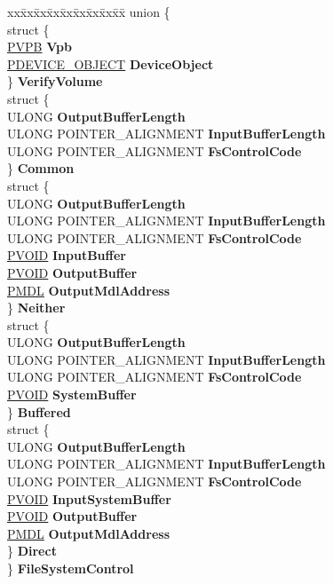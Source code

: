 \begin{DoxyCompactItemize}
\begin{tabbing}
\end{tabbing}\item 
\mbox{\label{union___f_l_t___p_a_r_a_m_e_t_e_r_s_a6e54639bd86b1bb9b2277ef36c242e44}} 
\begin{tabbing}
xx\=xx\=xx\=xx\=xx\=xx\=xx\=xx\=xx\=\kill
union \{\\
\>struct \{\\
\>\>\hyperlink{struct___v_p_b}{PVPB} {\bfseries Vpb}\\
\>\>\hyperlink{struct___d_e_v_i_c_e___o_b_j_e_c_t}{PDEVICE\_OBJECT} {\bfseries DeviceObject}\\
\>\} {\bfseries VerifyVolume}\\
\>struct \{\\
\>\>ULONG {\bfseries OutputBufferLength}\\
\>\>ULONG POINTER\_ALIGNMENT {\bfseries InputBufferLength}\\
\>\>ULONG POINTER\_ALIGNMENT {\bfseries FsControlCode}\\
\>\} {\bfseries Common}\\
\>struct \{\\
\>\>ULONG {\bfseries OutputBufferLength}\\
\>\>ULONG POINTER\_ALIGNMENT {\bfseries InputBufferLength}\\
\>\>ULONG POINTER\_ALIGNMENT {\bfseries FsControlCode}\\
\>\>\hyperlink{interfacevoid}{PVOID} {\bfseries InputBuffer}\\
\>\>\hyperlink{interfacevoid}{PVOID} {\bfseries OutputBuffer}\\
\>\>\hyperlink{interfacevoid}{PMDL} {\bfseries OutputMdlAddress}\\
\>\} {\bfseries Neither}\\
\>struct \{\\
\>\>ULONG {\bfseries OutputBufferLength}\\
\>\>ULONG POINTER\_ALIGNMENT {\bfseries InputBufferLength}\\
\>\>ULONG POINTER\_ALIGNMENT {\bfseries FsControlCode}\\
\>\>\hyperlink{interfacevoid}{PVOID} {\bfseries SystemBuffer}\\
\>\} {\bfseries Buffered}\\
\>struct \{\\
\>\>ULONG {\bfseries OutputBufferLength}\\
\>\>ULONG POINTER\_ALIGNMENT {\bfseries InputBufferLength}\\
\>\>ULONG POINTER\_ALIGNMENT {\bfseries FsControlCode}\\
\>\>\hyperlink{interfacevoid}{PVOID} {\bfseries InputSystemBuffer}\\
\>\>\hyperlink{interfacevoid}{PVOID} {\bfseries OutputBuffer}\\
\>\>\hyperlink{interfacevoid}{PMDL} {\bfseries OutputMdlAddress}\\
\>\} {\bfseries Direct}\\
\} {\bfseries FileSystemControl}\\


\end{tabbing}
\end{DoxyCompactItemize}
